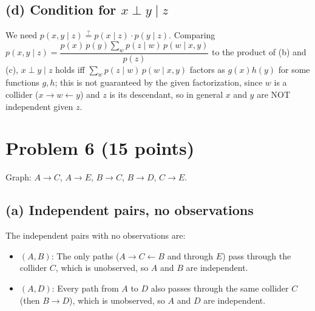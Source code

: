 \documentclass[11pt]{article}
\begin{document}
\subsection*{(d) Condition for $x \perp y \mid z$}
We need $p(x,y\mid z) \stackrel{?}{=} p(x\mid z)\cdot p(y\mid z)$. Comparing
$p(x,y\mid z) = \dfrac{p(x)\,p(y)\sum_w p(z\mid w)\,p(w\mid x,y)}{p(z)}$ to the product of
(b) and (c), $x\perp y\mid z$ holds iff $\sum_w p(z\mid w)\,p(w\mid x,y)$ factors as $g(x)h(y)$
for some functions $g,h$; this is not guaranteed by the given factorization, since $w$ is a
collider ($x\to w\leftarrow y$) and $z$ is its descendant, so in general $x$ and $y$ are NOT
independent given $z$.

\section*{Problem 6 (15 points)}

Graph: $A \to C$, $A \to E$, $B \to C$, $B \to D$, $C \to E$.

\subsection*{(a) Independent pairs, no observations}
The independent pairs with no observations are:
\begin{itemize}
\item $(A, B)$: The only paths ($A\to C \leftarrow B$ and through $E$) pass through the collider $C$, which is unobserved, so $A$ and $B$ are independent.
\item $(A, D)$: Every path from $A$ to $D$ also passes through the same collider $C$ (then $B \to D$), which is unobserved, so $A$ and $D$ are independent.
\end{itemize}
\end{document}
